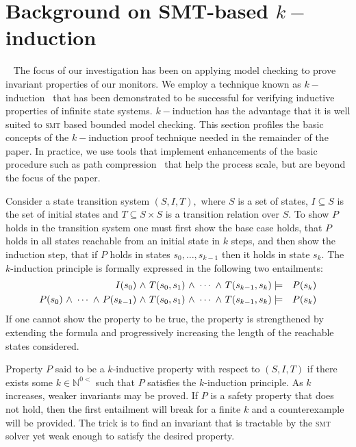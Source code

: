 \section{Background on SMT-based $k-$induction}~\label{sec:background} 
The focus of our  investigation has  been on applying model checking to  prove
invariant properties of our monitors.   We  
employ a  technique known as $k-$induction~\cite{Sheeran00,EenS03} that has been demonstrated to be successful for verifying inductive
properties of infinite state systems.   $k-$induction  has the
advantage that it is well suited  to  \textsc{smt} 
based bounded model checking. This section profiles the
basic concepts of the  $k-$induction proof technique needed in the
remainder of the paper. In practice, we use tools that implement  enhancements of the basic procedure such as path compression~\cite{dMRS03} that help the process scale, but are beyond the focus of the paper. 

Consider  a state transition system  $(S,I,T),$
where $S$ is a set of states, $I \subseteq S$ is the set of initial
states and $T \subseteq S \times S $ is a transition relation over
$S.$ To show $P$ holds in the transition system one must first
show the base case holds, that  $P$ holds in all states reachable
from an initial state in $k$ steps, and then show the induction step,
that if $P$ holds in states $s_0,\ldots,s_{k-1}$ then it holds in
state $s_k.$ The $k$-induction principle is formally expressed in the
following two entailments:
\begin{eqnarray*}
I(s_0) {\ \wedge \ } T(s_0,s_1) {\ \wedge \ } \cdots {\ \wedge \ } T(s_{k-1},s_k) &\models&
P(s_k) \\
P(s_0) {\ \wedge \ } \cdots {\ \wedge \ } P(s_{k-1}) {\ \wedge \ } T(s_0,s_1) {\ \wedge \ } \cdots {\ \wedge \ } T(s_{k-1},s_k) &\models&
P(s_k) 
\end{eqnarray*} 
If one cannot show the property to be true, the
property is strengthened by extending the formula and
progressively increasing the length of the reachable states
considered.  

Property $P$ said to be a $k$-inductive property with respect to
$(S,I,T)$ if there exists some $k \in \mathbb{N}^{0<}$ such that $P$
satisfies the $k$-induction principle. As $k$ increases, weaker
invariants may be proved. If $P$ is a safety property that does not hold, then the first entailment will break for a finite $k$ and a counterexample will be provided. The trick is to find an invariant that is
tractable by the \textsc{smt} solver yet weak enough to satisfy the desired
property.  
